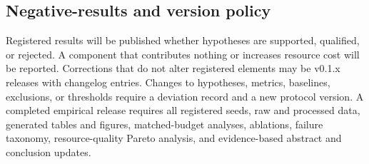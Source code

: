 \subsection{Negative-results and version policy}

Registered results will be published whether hypotheses are supported, qualified, or rejected. A component that contributes nothing or increases resource cost will be reported. Corrections that do not alter registered elements may be v0.1.x releases with changelog entries. Changes to hypotheses, metrics, baselines, exclusions, or thresholds require a deviation record and a new protocol version. A completed empirical release requires all registered seeds, raw and processed data, generated tables and figures, matched-budget analyses, ablations, failure taxonomy, resource-quality Pareto analysis, and evidence-based abstract and conclusion updates.
